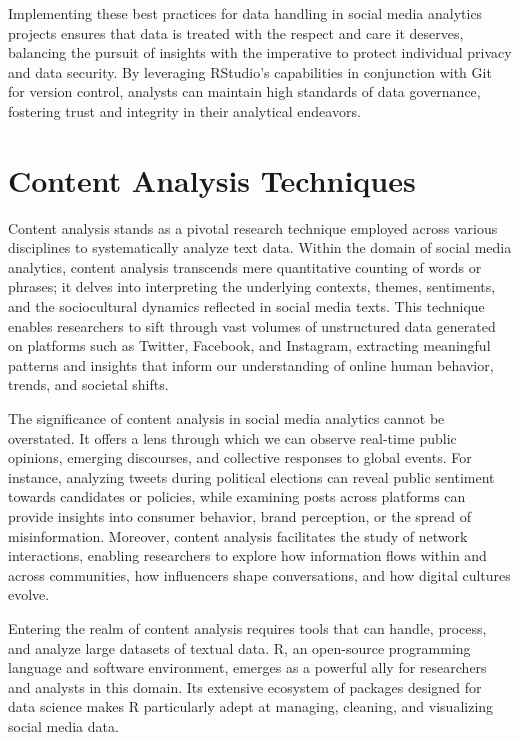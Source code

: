 \documentclass[
]{book}
\begin{document}
Implementing these best practices for data handling in social media analytics projects ensures that data is treated with the respect and care it deserves, balancing the pursuit of insights with the imperative to protect individual privacy and data security. By leveraging RStudio's capabilities in conjunction with Git for version control, analysts can maintain high standards of data governance, fostering trust and integrity in their analytical endeavors.

\hypertarget{content-analysis-techniques}{%
\chapter{Content Analysis Techniques}\label{content-analysis-techniques}}

Content analysis stands as a pivotal research technique employed across various disciplines to systematically analyze text data. Within the domain of social media analytics, content analysis transcends mere quantitative counting of words or phrases; it delves into interpreting the underlying contexts, themes, sentiments, and the sociocultural dynamics reflected in social media texts. This technique enables researchers to sift through vast volumes of unstructured data generated on platforms such as Twitter, Facebook, and Instagram, extracting meaningful patterns and insights that inform our understanding of online human behavior, trends, and societal shifts.

The significance of content analysis in social media analytics cannot be overstated. It offers a lens through which we can observe real-time public opinions, emerging discourses, and collective responses to global events. For instance, analyzing tweets during political elections can reveal public sentiment towards candidates or policies, while examining posts across platforms can provide insights into consumer behavior, brand perception, or the spread of misinformation. Moreover, content analysis facilitates the study of network interactions, enabling researchers to explore how information flows within and across communities, how influencers shape conversations, and how digital cultures evolve.

Entering the realm of content analysis requires tools that can handle, process, and analyze large datasets of textual data. R, an open-source programming language and software environment, emerges as a powerful ally for researchers and analysts in this domain. Its extensive ecosystem of packages designed for data science makes R particularly adept at managing, cleaning, and visualizing social media data.
\end{document}
